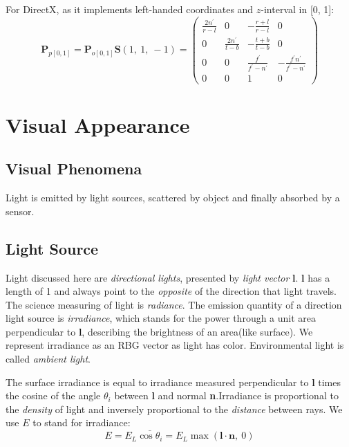 \documentclass[10pt, a4paper]{article}
\begin{document}
            For DirectX, as it implements left-handed coordinates and $z$-interval in [0, 1]:
            \begin{equation*}
                \textbf{P}_{p[0,1]} = \textbf{P}_{o[0, 1]}\textbf{S}(1,\ 1,\ -1) = 
                \begin{pmatrix}
                    \frac{2n^{'}}{r - l} & 0 & -\frac{r + l}{r - l} & 0\\
                    0 & \frac{2n^{'}}{t - b} & -\frac{t + b}{t - b} & 0\\
                    0 & 0 & \frac{f^{'}}{f^{'} - n^{'}} & -\frac{f^{'}n^{'}}{f^{'} - n^{'}}\\
                    0 & 0 & 1 & 0
                \end{pmatrix}
            \end{equation*}
            \newpage

\section{Visual Appearance}
    \subsection{Visual Phenomena} 
        Light is emitted by light sources, scattered by object and finally absorbed by a sensor.
    \subsection{Light Source}
        Light discussed here are \emph{directional lights}, presented by \emph{light vector} \textbf{l}. $\textbf{l}$ has a length of 1 and always point to the \emph{opposite} of the direction that light travels. The science measuring of light is \emph{radiance}. The emission quantity of a direction light source is \emph{irradiance}, which stands for the power through a unit area perpendicular to \textbf{l}, describing the brightness of an area(like surface). We represent irradiance as an RBG vector as light has color. Environmental light is called \emph{ambient light}.
            
        The surface irradiance is equal to irradiance measured perpendicular to \textbf{l} times the cosine of the angle $\theta_i$ between \textbf{l} and normal \textbf{n}.Irradiance is proportional to the \emph{density} of light and inversely proportional to the \emph{distance} between rays. We use $E$ to stand for irradiance:
        $$E = E_L\bar{\cos{\theta_i}} = E_L \max(\textbf{l}\cdot\textbf{n},\ 0)$$
        
\end{document}
